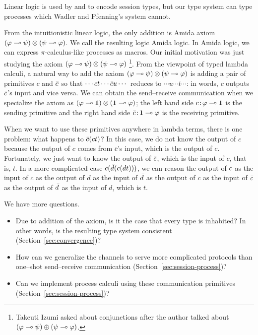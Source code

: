 Linear logic is used by \citet{wadler2012propositions} and
\citet{pfenning2010} to encode session types, but our type system can
type processes
which Wadler
and Pfenning's system cannot.

From the intuitionistic linear logic,
the only addition is Amida axiom
$(\varphi\multimap\psi)\otimes(\psi\multimap\varphi)$.
We call the resulting logic Amida logic.
In Amida logic, we can express $\pi$-calculus-like processes as macros.
Our initial motivation was just studying the axiom
$(\varphi\multimap\psi)\otimes(\psi\multimap\varphi)$%
\footnote{Takeuti Izumi asked about conjunctions
after the author talked about $(\varphi\multimap\psi)\oplus (\psi\multimap\varphi)$.}.
From the viewpoint of typed lambda calculi, a natural way to add
the axiom
$(\varphi\multimap\psi)\otimes(\psi\multimap\varphi)$
is adding a pair of primitives $c$ and $\bar{c}$ so that
$\cdots ct \cdots \bar{c} u \cdots$ reduces to
$\cdots u  \cdots t \cdots$: in words,
$c$ outputs $\bar{c}$'s input and vice versa.
We can obtain the send--receive communication when we specialize the
axiom as $(\varphi\multimap \mathbf{1})\otimes(\mathbf{1}\multimap\varphi)$; the left hand side
${c} \mathord{\colon\kern -2pt}{\varphi\multimap\mathbf{1}}$ is the sending primitive and
the right hand side ${\bar{c}} \mathord{\colon\kern -2pt}{\mathbf{1} \multimap\varphi}$ is the receiving
primitive.

When we want to use these primitives anywhere in lambda terms,
there is one problem: what happens to $\bar{c}(c t)$?
In this case, we do not know the output of $c$ because the output of $c$
comes from $\bar c$'s input, which is the output of $c$.
Fortunately, we just want to know the output of $\bar{c}$, which is the
input of $c$, that is, $t$.
In a more complicated case $\bar{c}(\bar{d}(c (d t)))$,
we can reason the output of $\bar{c}$ as the input of $c$ as the output of
$d$ as the input of $\bar{d}$ as the output of $c$ as the input of $\bar{c}$
as the output of $\bar{d}$ as the input of $d$, which is $t$.

We have more questions.
\begin{itemize}
 \item Due to addition of the axiom, is it the case that
       every type is inhabited?  In other words,
      is the resulting type system consistent (Section~\ref{sec:convergence})?
 \item How can we generalize the channels to serve more complicated
       protocols than one--shot send--receive communication (Section~\ref{sec:session-process})?
 \item Can we implement process calculi using these communication
       primitives (Section~\ref{sec:session-process})?
\end{itemize}


